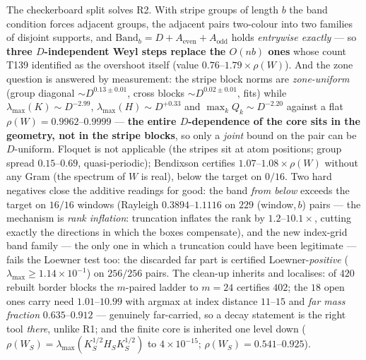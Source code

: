 \documentclass[11pt,a4paper]{article}
\begin{document}
The checkerboard split solves R2. With stripe groups of length $b$ the band condition forces
adjacent groups, the adjacent pairs two-colour into two families of disjoint supports, and
$\mathrm{Band}_b=D+A_{\mathrm{even}}+A_{\mathrm{odd}}$ holds \emph{entrywise exactly} --- so
\textbf{three $D$-independent Weyl steps replace the $O(nb)$ ones} whose count T139 identified as
the overshoot itself (value $0.76$--$1.79\times\rho(W)$). And the zone question is answered by
measurement: the stripe block norms are \emph{zone-uniform} (group diagonal
$\sim D^{0.13\pm0.01}$, cross blocks $\sim D^{0.02\pm0.01}$, fits) while
$\lambda_{\max}(K)\sim D^{-2.99}$, $\lambda_{\max}(H)\sim D^{+0.33}$ and
$\max_kQ_k\sim D^{-2.20}$ against a flat $\rho(W)=0.9962$--$0.9999$ --- \textbf{the entire
$D$-dependence of the core sits in the geometry, not in the stripe blocks}, so only a \emph{joint}
bound on the pair can be $D$-uniform. Floquet is not applicable (the stripes sit at atom
positions; group spread $0.15$--$0.69$, quasi-periodic); Bendixson certifies
$1.07$--$1.08\times\rho(W)$ without any Gram (the spectrum of $W$ is real), below the target on
$0/16$. Two hard negatives close the additive readings for good: the band \emph{from below}
exceeds the target on $16/16$ windows (Rayleigh $0.3894$--$1.1116$ on $229$ (window,\,$b$) pairs
--- the mechanism is \emph{rank inflation}: truncation inflates the rank by $1.2$--$10.1\times$,
cutting exactly the directions in which the boxes compensate), and the new index-grid band family
--- the only one in which a truncation could have been legitimate --- fails the Loewner test too:
the discarded far part is certified Loewner-\emph{positive}
($\lambda_{\max}\ge1.14\times10^{-1}$) on $256/256$ pairs. The clean-up inherits and localises: of
$420$ rebuilt border blocks the $m$-paired ladder to $m=24$ certifies $402$; the $18$ open ones
carry need $1.01$--$10.99$ with argmax at index distance $11$--$15$ and \emph{far mass fraction}
$0.635$--$0.912$ --- genuinely far-carried, so a decay statement is the right tool \emph{there},
unlike R1; and the finite core is inherited one level down
($\rho(W_S)=\lambda_{\max}(K_S^{1/2}H_SK_S^{1/2})$ to $4\times10^{-15}$;
$\rho(W_S)=0.541$--$0.925$).
\end{document}
